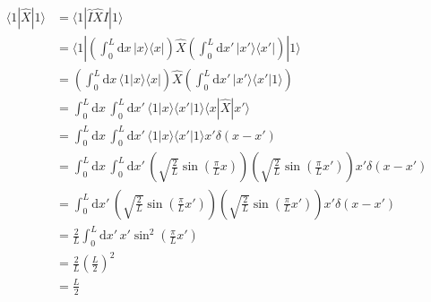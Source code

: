 \documentclass[letter]{article}
\begin{document}
\begin{align*}
	\langle 1 | \hat{X} | 1 \rangle  &= 
\langle 1 | \hat{I} \hat{X} \hat{I} | 1 \rangle 
	\\ 
	&= 
\langle 1 | 
\left(\int_{0}^{L}  \mathrm{d} x \, | x \rangle \langle x | \right)
	\hat{X}
\left(\int_{0}^{L}  \mathrm{d} x' \, | x' \rangle \langle x' | \right) | 1 \rangle 
     \\ &= 
\left(\int_{0}^{L}  \mathrm{d} x \, \langle 1 | x \rangle \langle x | \right)
	\hat{X}
\left(\int_{0}^{L}  \mathrm{d} x' \, | x' \rangle \langle x' | 1 \rangle \right) 
\\ &=  
\int_{0}^{L}  \mathrm{d} x \, 
\int_{0}^{L}  \mathrm{d} x' \, 
\langle 1 | x \rangle \langle x' | 1 \rangle \langle x | \hat{X} | x' \rangle 
\\ &= 
\int_{0}^{L}  \mathrm{d} x \, 
\int_{0}^{L}  \mathrm{d} x' \, 
\langle 1 | x \rangle \langle x' | 1 \rangle x' \delta(x - x')
\\ &=
\int_{0}^{L} \mathrm{d} x \, 
\int_{0}^{L} \mathrm{d} x' \, 
\left(\sqrt{\frac{2}{L}}  \sin\left(\frac{\pi}{L}x\right) \right) 
\left(\sqrt{\frac{2}{L}}  \sin\left(\frac{\pi}{L}x'\right)\right) x' \delta(x-x')
\\ &=
\int_{0}^{L} \mathrm{d} x' \, 
\left(\sqrt{\frac{2}{L}}  \sin\left(\frac{\pi}{L}x'\right) \right) 
\left(\sqrt{\frac{2}{L}}  \sin\left(\frac{\pi}{L}x'\right)\right) x' \delta(x-x') \\
&=  
\frac{2}{L} 
\int_{0}^{L}  \mathrm{d} x' \, x' \sin^2 \left(\frac{\pi}{L}x'\right)  
\\
&= 
\frac{2}{L} \left(\frac{L}{2}\right)^2
\\
&= \frac{L}{2} 
\end{align*}
\end{document}
